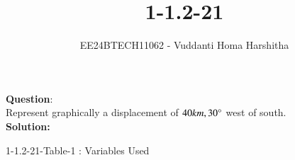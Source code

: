\documentclass[journal]{IEEEtran}
\numberwithin{equation}{enumi}
\begin{document}



\title{1-1.2-21}
\author{EE24BTECH11062 - Vuddanti Homa Harshitha
}
{\let\newpage\relax\maketitle}

\renewcommand{\thefigure}{\theenumi}
\renewcommand{\thetable}{\theenumi}
\setlength{\intextsep}{10pt} %

\renewcommand{\thetable}{\theenumi}


\textbf{Question}:\\
Represent graphically a displacement of $40km, 30\degree$  west of south.
\\
\textbf{Solution: }
\begin{table}[h!]    
  \centering
  
  \caption*{1-1.2-21-Table-1 : Variables Used}
\end{table}
\end{document}

